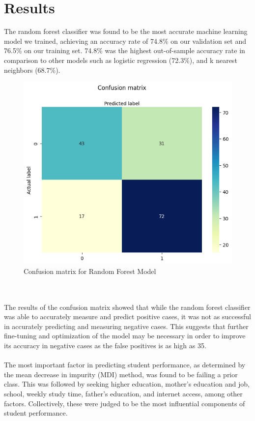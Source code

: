 \documentclass[twoside,twocolumn]{article}
\begin{document}
\section{Results}
The random forest classifier was found to be the most accurate machine learning model we trained, achieving an accuracy rate of 74.8\% on our validation set and 76.5\% on our training set. 74.8\% was the highest out-of-sample accuracy rate in comparison to other models such as logistic regression (72.3\%), and k nearest neighbors (68.7\%).
\begin{figure}
  \includegraphics[width=\linewidth]{confusion_matrix.png}
  \caption{Confusion matrix for Random Forest Model}
  \label{fig:matrix}
\end{figure}
\\ \\
The results of the confusion matrix showed that while the random forest classifier was able to accurately measure and predict positive cases, it was not as successful in accurately predicting and measuring negative cases. This suggests that further fine-tuning and optimization of the model may be necessary in order to improve its accuracy in negative cases as the false positives is as high as 35.
\\ \\
The most important factor in predicting student performance, as determined by the mean decrease in impurity (MDI) method, was found to be failing a prior class. This was followed by seeking higher education, mother's education and job, school, weekly study time, father's education, and internet access, among other factors. Collectively, these were judged to be the most influential components of student performance.
\end{document}
